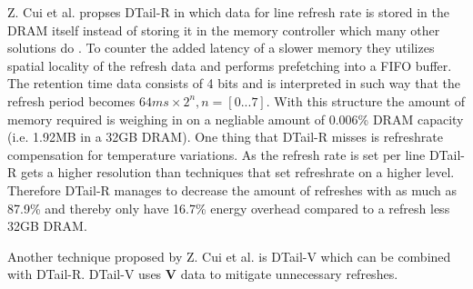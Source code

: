 Z. Cui et al. \cite{dtail} propses DTail-R in which data for line refresh rate is stored in the DRAM itself instead of storing it in the memory controller which many other solutions do \cite{raidr}\cite{smartrefresh}\cite{refrint}. To counter the added latency of a slower memory they utilizes spatial locality of the refresh data and performs prefetching into a FIFO buffer. The retention time data consists of 4 bits and is interpreted in such way that the refresh period becomes \(64ms \times 2^n, n = [0...7]\). With this structure the amount of memory required is weighing in on a negliable amount of 0.006\% DRAM capacity (i.e. 1.92MB in a 32GB DRAM). One thing that DTail-R misses is refreshrate compensation for temperature variations. As the refresh rate is set per line DTail-R gets a higher resolution than techniques that set refreshrate on a higher level. Therefore DTail-R manages to decrease the amount of refreshes with as much as 87.9\% and thereby only have 16.7\% energy overhead compared to a refresh less 32GB DRAM. 

Another technique proposed by Z. Cui et al. is DTail-V \cite{dtail} which can be combined with DTail-R. DTail-V uses \textbf{V} data to mitigate unnecessary refreshes. 